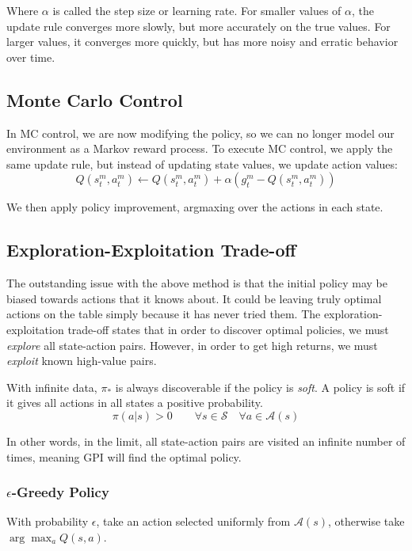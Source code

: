 \documentclass{article}
\begin{document}
Where $\alpha$ is called the step size or learning rate. For smaller values of $\alpha$, the update rule converges more slowly, but more accurately
on the true values. For larger values, it converges more quickly, but has more noisy and erratic behavior over time. 

\subsection{Monte Carlo Control}
\label{sec:mc-control}
In MC control, we are now modifying the policy, so we can no longer model our environment as a Markov reward process. To execute MC control, 
we apply the same update rule, but instead of updating state values, we update action values:
\begin{equation}
  Q(s_t^m, a_t^m) \leftarrow Q(s_t^m, a_t^m) + \alpha (g_t^m - Q(s_t^m, a_t^m))
\end{equation}

We then apply policy improvement, argmaxing over the actions in each state.

\subsection{Exploration-Exploitation Trade-off}
The outstanding issue with the above method is that the initial policy may be biased towards actions that it knows about.
It could be leaving truly optimal actions on the table simply because it has never tried them. The exploration-exploitation
trade-off states that in order to discover optimal policies, we must \emph{explore} all state-action pairs. However, in order to get
high returns, we must \emph{exploit} known high-value pairs. 

With infinite data, $\pi_*$ is always discoverable if the policy is \emph{soft}. A policy is soft if it gives all actions in all states
a positive probability.
\begin{equation}
  \pi(a|s) > 0 \qquad \forall s \in \mathcal{S} \quad \forall a \in \mathcal{A}(s)
\end{equation}

In other words, in the limit, all state-action pairs are visited an infinite number of times, meaning GPI will find the optimal policy.

\subsubsection{$\epsilon$-Greedy Policy}
With probability $\epsilon$, take an action selected uniformly from $\mathcal{A}(s)$, otherwise take $\arg \max_a Q(s,a)$.
\end{document}
